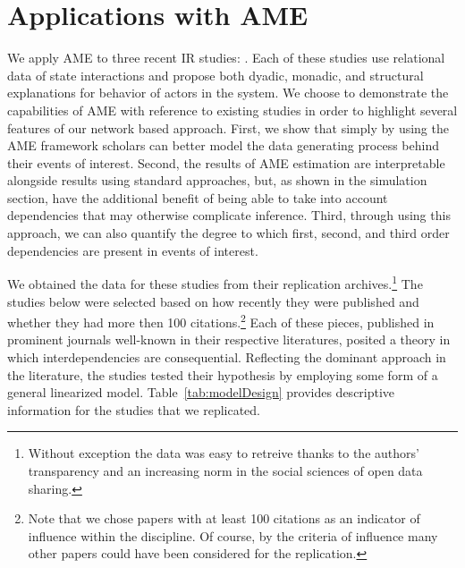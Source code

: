 \section{\textbf{Applications with AME}}

We apply AME to three recent IR studies: \citet{reiter:stam:2003, weeks:2012, gibler:2017}. Each of these studies use relational data of state interactions and propose both dyadic, monadic, and structural explanations for behavior of actors in the system. We choose to demonstrate the capabilities of AME with reference to existing studies in order to highlight several features of our network based approach. First, we show that simply by using the AME framework scholars can better model the data generating process behind their events of interest. Second, the results of AME estimation are interpretable alongside results using standard approaches, but, as shown in the simulation section, have the additional benefit of being able to take into account dependencies that may otherwise complicate inference. Third, through using this approach, we can also quantify the degree to which first, second, and third order dependencies are present in events of interest.

We obtained the data for these studies from their replication archives.\footnote{Without exception the data was easy to retreive thanks to the authors' transparency and an increasing norm in the social sciences of open data sharing.} The studies below were selected based on how recently they were published and whether they had more then 100 citations.\footnote{Note that we chose papers with at least 100 citations as an indicator of influence within the discipline. Of course, by the criteria of influence many other papers could have been considered for the replication.} Each of these pieces, published in prominent journals well-known in their respective literatures, posited a theory in which interdependencies are consequential. Reflecting the dominant approach in the literature, the studies tested their hypothesis by employing some form of a general linearized model. Table~\ref{tab:modelDesign} provides descriptive information for the studies that we replicated.

